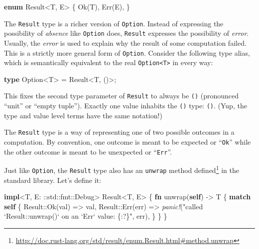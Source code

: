 \documentclass[a4paper,]{book}
\newenvironment{Shaded}{\begin{snugshade}}{\end{snugshade}}
\newcommand{\KeywordTok}[1]{\textcolor[rgb]{0.13,0.29,0.53}{\textbf{{#1}}}}
\newcommand{\DataTypeTok}[1]{\textcolor[rgb]{0.13,0.29,0.53}{{#1}}}
\newcommand{\ConstantTok}[1]{\textcolor[rgb]{0.00,0.00,0.00}{{#1}}}
\newcommand{\StringTok}[1]{\textcolor[rgb]{0.31,0.60,0.02}{{#1}}}
\newcommand{\BuiltInTok}[1]{{#1}}
\newcommand{\PreprocessorTok}[1]{\textcolor[rgb]{0.56,0.35,0.01}{\textit{{#1}}}}
\newcommand{\NormalTok}[1]{{#1}}
\renewcommand{\href}[2]{#2\footnote{\url{#1}}}
\begin{document}
\begin{Shaded}
\begin{Highlighting}[]
\KeywordTok{enum} \DataTypeTok{Result}\NormalTok{<T, E> \{}
    \ConstantTok{Ok}\NormalTok{(T),}
    \ConstantTok{Err}\NormalTok{(E),}
\NormalTok{\}}
\end{Highlighting}
\end{Shaded}

The \texttt{Result} type is a richer version of \texttt{Option}. Instead
of expressing the possibility of \emph{absence} like \texttt{Option}
does, \texttt{Result} expresses the possibility of \emph{error}.
Usually, the \emph{error} is used to explain why the result of some
computation failed. This is a strictly more general form of
\texttt{Option}. Consider the following type alias, which is
semantically equivalent to the real
\texttt{Option\textless{}T\textgreater{}} in every way:

\begin{Shaded}
\begin{Highlighting}[]
\KeywordTok{type} \NormalTok{Option<T> = }\DataTypeTok{Result}\NormalTok{<T, ()>;}
\end{Highlighting}
\end{Shaded}

This fixes the second type parameter of \texttt{Result} to always be
\texttt{()} (pronounced ``unit'' or ``empty tuple''). Exactly one value
inhabits the \texttt{()} type: \texttt{()}. (Yup, the type and value
level terms have the same notation!)

The \texttt{Result} type is a way of representing one of two possible
outcomes in a computation. By convention, one outcome is meant to be
expected or ``\texttt{Ok}'' while the other outcome is meant to be
unexpected or ``\texttt{Err}''.

Just like \texttt{Option}, the \texttt{Result} type also has an
\href{http://doc.rust-lang.org/std/result/enum.Result.html\#method.unwrap}{\texttt{unwrap}
method defined} in the standard library. Let's define it:

\begin{Shaded}
\begin{Highlighting}[]
\KeywordTok{impl}\NormalTok{<T, E: ::std::fmt::}\BuiltInTok{Debug}\NormalTok{> }\DataTypeTok{Result}\NormalTok{<T, E> \{}
    \KeywordTok{fn} \NormalTok{unwrap(}\KeywordTok{self}\NormalTok{) -> T \{}
        \KeywordTok{match} \KeywordTok{self} \NormalTok{\{}
            \DataTypeTok{Result}\NormalTok{::}\ConstantTok{Ok}\NormalTok{(val) => val,}
            \DataTypeTok{Result}\NormalTok{::}\ConstantTok{Err}\NormalTok{(err) =>}
              \PreprocessorTok{panic!}\NormalTok{(}\StringTok{"called `Result::unwrap()` on an `Err` value: \{:?\}"}\NormalTok{, err),}
        \NormalTok{\}}
    \NormalTok{\}}
\NormalTok{\}}
\end{Highlighting}
\end{Shaded}
\end{document}
